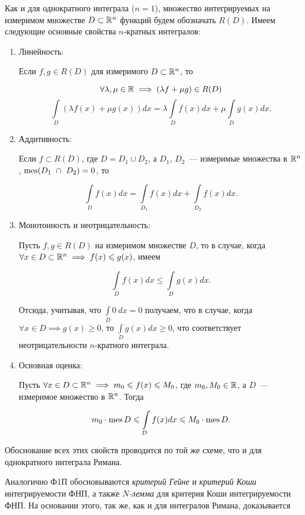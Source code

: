 \documentclass[../../main.tex]{subfiles}
\begin{document}
Как и для однократного интеграла ($n = 1$), множество 
интегрируемых на измеримом множестве 
$D \subset \mathbb{R}^n$ функций будем обозначать
$R(D)$. Имеем следующие основные свойства $n$-кратных интегралов:

\begin{enumerate}
	\item Линейность:
	
	Если $f, g \in R(D)$ для измеримого $D \subset \mathbb{R}^n$, то
	
	\[
			\forall \lambda, \mu \in \mathbb{R} \implies (\lambda f + \mu g) \in R(D)
	\]
	\[
			\int\limits_D (\lambda f(x) + \mu g(x))dx = \lambda \int\limits_D f(x)dx +
			\mu \int\limits_D g(x)dx.
	\]
	
	\item Аддитивность:
	
	Если $f \subset R(D)$, где $D = D_1 \cup D_2$, 
	а $D_1$, $D_2$~--- измеримые множества в $\mathbb{R}^n$,
	$\operatorname{mes}(D_1~\cap~D_2) = 0$, то
	
	\[
		\int\limits_{D}f(x)dx = \int\limits_{D_1}f(x)dx + \int\limits_{D_2}f(x)dx.
	\]
		
	\item Монотонность и неотрицательность:
	
	Пусть $f, g \in R(D)$ на измеримом множестве $D$, то 
	в случае, когда 
	$\forall x \in D \subset \mathbb{R}^n \implies f(x) \leqslant g(x)$, имеем
	
	\[
	\int\limits_Df(x)dx \le \int\limits_Dg(x)dx.
	\]
	
	Отсюда, учитывая, что $\int\limits_D0\:dx=0$ получаем, что в случае, когда 
	$\forall x \in D \implies g(x) \ge 0$, то $\int\limits_Dg(x)dx \ge 0$, 
	что соответствует неотрицательности $n$-кратного интеграла.
	
	\item Основная оценка:
	
	Пусть $\forall x \in D \subset \mathbb{R}^n \implies m_0 \leqslant f(x) \leqslant M_0$, где
	$m_0, M_0 \in \mathbb{R}$, а $D$~--- измеримое множество в $\mathbb{R}^n$. Тогда
	
	\[
		m_0 \cdot \operatorname{mes} D \leqslant \int\limits_D f(x) dx \leqslant M_0 \cdot \operatorname{mes} D.
	\]
\end{enumerate}


Обоснование всех этих свойств проводится по той же схеме, 
что и для однократного интеграла Римана.

Аналогично Ф1П обосновываются \emph{критерий Гейне} 
и \emph{критерий Коши} интегрируемости ФНП,
а также \emph{$N$-лемма} для критерия Коши интегрируемости ФНП. 
На основании этого, так же, как и для
интегралов Римана, доказывается
\end{document}
